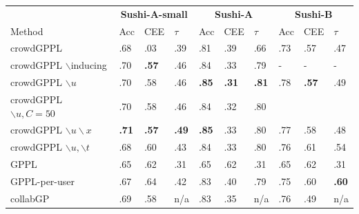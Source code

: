 \begin{table}
 \centering
 \small
 \setlength{\tabcolsep}{4pt}
 \begin{tabular}{l l l l@{\hskip 0.5cm} l l l@{\hskip 0.5cm} l l l}
\toprule
& \multicolumn{3}{c}{\textbf{Sushi-A-small}} & \multicolumn{3}{c}{\textbf{Sushi-A}} & \multicolumn{3}{c}{\textbf{Sushi-B}} \\ 
Method & Acc & CEE & $\tau$ & Acc & CEE & $\tau$ & Acc & CEE & $\tau$ \\
\midrule
crowdGPPL & .68 & .03 & .39 %
& .81 & .39 & .66 %
& .73 & .57 & .47 %
\\
crowdGPPL $\backslash $inducing & .70 & \textbf{.57} & .46 %
& .84 & .33 & .79 %
& - & - & - 
\\
crowdGPPL $\backslash u$ & .70 & .58 & .46 &  %
\textbf{.85} & \textbf{.31} & \textbf{.81} %
& .78 &\textbf{.57} & .49 %
\\
crowdGPPL $\backslash u, C=50$ & .70 & .58 & .46 & .84 & .32 & .80 & 
\\
crowdGPPL $\backslash u \backslash x$ & \textbf{.71} & \textbf{.57} & \textbf{.49} & %
\textbf{.85} & .33 & .80 %
& .77 & .58 & .48 %
\\
crowdGPPL $\backslash u,\backslash t$ %
& .68 & .60 & .43 %
& .84 & .33 & .80 %
& .76 & .61 & .54 %
\\ 
\midrule 
GPPL & .65 & .62 & .31 %
& .65 & .62 & .31 %
& .65 & .62 & .31 %
\\
GPPL-per-user & .67 & .64 & .42 %
& .83 & .40 & .79 %
& .75 & .60 & \textbf{.60} %
\\
collabGP & .69 & .58 & n/a %
& .83 & .35 & n/a %
& .76 & .49 & n/a %

\end{tabular}
\end{table}
